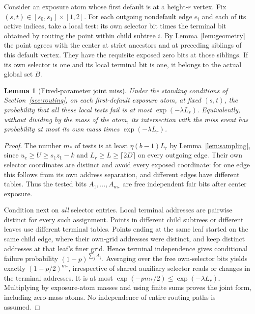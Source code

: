 \documentclass[11pt]{article}
\newtheorem{lemma}[theorem]{Lemma}
\theoremstyle{definition}
\theoremstyle{remark}
\begin{document}
Consider an exposure atom whose first default is at a height-$r$ vertex.
Fix $(s,t)\in[s_0,s_1]\times[1,2]$. For each outgoing nondefault edge $e_i$
and each of its active indices, take a local test: its own selector bit times
the terminal bit obtained by routing the point within child subtree $i$.
By Lemma~\ref{lem:geometry} the point agrees with the center at strict ancestors
and at preceding siblings of this default vertex. They have the requisite
exposed zero bits at those siblings. If its own selector is one and its local
terminal bit is one, it belongs to the actual global set $B$.

\begin{lemma}[Fixed-parameter joint miss]\label{lem:joint}
Under the standing conditions of Section~\ref{sec:routing}, on each
first-default exposure atom, at fixed
$(s,t)$, the probability that all these local tests fail is at most
$\exp(-\lambda L_r)$. Equivalently, without dividing by the mass of the atom,
its intersection with the miss event has probability at most its own mass
times $\exp(-\lambda L_r)$.
\end{lemma}
\begin{proof}
The number $m_*$ of tests is at least $\eta(b-1)L_r$ by
Lemma~\ref{lem:sampling}, since $u_e\geq U\geq s_1z_1-k$ and
$L_r\geq L\geq\lceil2D\rceil$ on every outgoing edge.
Their own selector coordinates are distinct and avoid
every exposed coordinate: for one edge this follows from its own address
separation, and different edges have different tables. Thus the tested bits
$A_1,\ldots,A_{m_*}$ are free independent fair bits after center exposure.

Condition next on \emph{all} selector entries. Local terminal addresses are
pairwise distinct for every such assignment. Points in different child
subtrees or different leaves use different terminal tables. Points ending at
the same leaf started on the same child edge, where their own-grid addresses
were distinct, and keep distinct addresses at that leaf's finer grid. Hence
terminal independence gives conditional failure probability
$(1-p)^{\sum_j A_j}$. Averaging over the free own-selector bits yields exactly
$(1-p/2)^{m_*}$, irrespective of shared auxiliary selector reads or changes in
the terminal addresses. It is at most
$\exp(-pm_*/2)\leq\exp(-\lambda L_r)$.
Multiplying by exposure-atom masses and using finite sums proves the joint
form, including zero-mass atoms. No independence of entire routing paths is
assumed.
\end{proof}
\end{document}
